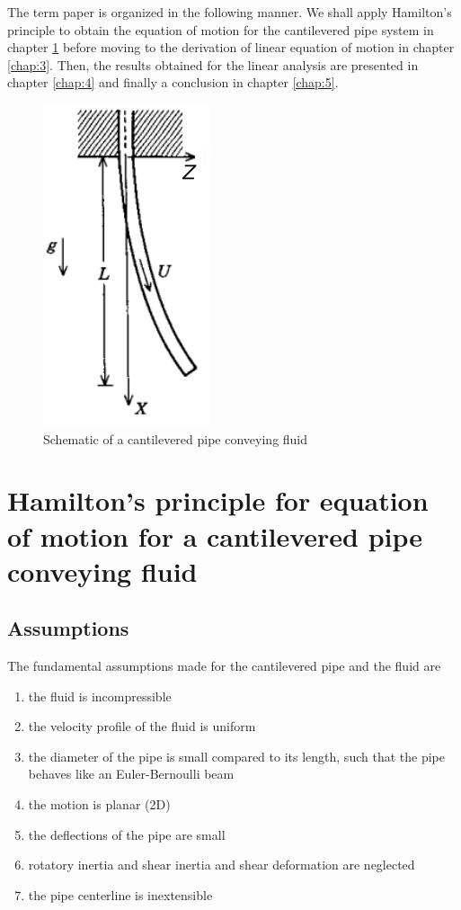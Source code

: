 \documentclass[12pt]{report}
\begin{document}
The term paper is organized in the following manner. We shall apply Hamilton's principle to obtain the equation of motion for the cantilevered pipe system in chapter \ref{chap:2} before moving to the derivation of linear equation of motion in chapter \ref{chap:3}. Then, the results obtained for the linear analysis are presented in chapter \ref{chap:4} and finally a conclusion in chapter \ref{chap:5}.

\begin{figure}
	\centering
	\includegraphics[width=0.15\linewidth]{cantilevered-pipe-schematic}
	\caption{Schematic of a cantilevered pipe conveying fluid}
	\label{fig:cantilevered-pipe-schematic}
\end{figure}


\chapter{Hamilton's principle for equation of motion for a cantilevered pipe conveying fluid}\label{chap:2}

\section{Assumptions}
The fundamental assumptions made for the cantilevered pipe and the fluid are 
\begin{enumerate}[label=(\alph*)]
	\item the fluid is incompressible 
	\item the velocity profile of the fluid is uniform 
	\item the diameter of the pipe is small compared to its length, such that the pipe behaves like an Euler-Bernoulli beam
	\item the motion is planar (2D)
	\item the deflections of the pipe are small
	\item rotatory inertia and shear inertia and shear deformation are neglected
	\item the pipe centerline is inextensible 
\end{enumerate}
\end{document}
